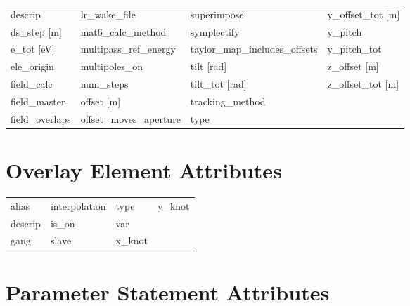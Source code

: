 \begin{tabular}{llll}
descrip                          & lr_wake_file                     & superimpose                      & y_offset_tot [m]                 \\
ds_step [m]                      & mat6_calc_method                 & symplectify                      & y_pitch                          \\
e_tot [eV]                       & multipass_ref_energy             & taylor_map_includes_offsets      & y_pitch_tot                      \\
ele_origin                       & multipoles_on                    & tilt [rad]                       & z_offset [m]                     \\
field_calc                       & num_steps                        & tilt_tot [rad]                   & z_offset_tot [m]                 \\
field_master                     & offset [m]                       & tracking_method                  &                                  \\
field_overlaps                   & offset_moves_aperture            & type                             &                                  \\
 \bottomrule
 \end{tabular}
 \vfill
 
 \section{Overlay Element Attributes}
 \label{s:list.overlay}
 
 \begin{tabular}{llll} \toprule
alias                            & interpolation                    & type                             & y_knot                           \\
descrip                          & is_on                            & var                              &                                  \\
gang                             & slave                            & x_knot                           &                                  \\
 \bottomrule
 \end{tabular}
 \vfill
 
 \section{Parameter Statement Attributes}
 \label{s:list.parameter}
 
